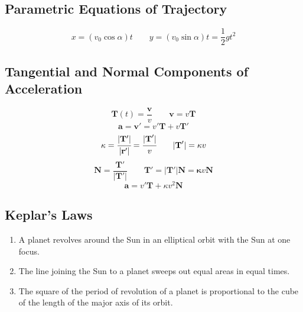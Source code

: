 \subsection*{Parametric Equations of Trajectory}
$$x=(v_0\cos{\alpha})t\qquad y=(v_0\sin{\alpha})t=\frac{1}{2}gt^2$$

\subsection*{Tangential and Normal Components of Acceleration}
$$\textbf{T}(t)=\frac{\textbf{v}}{v} \qquad \textbf{v}=v\textbf{T}$$
$$\textbf{a}=\textbf{v}'=v'\textbf{T}+v\textbf{T}'$$
$$\kappa=\mathbf{\cfrac{|T'|}{|r'|}}=\cfrac{|\textbf{T}'|}{v} \qquad
    |\textbf{T}'|=\kappa v$$
$$\textbf{N}=\mathbf{\frac{T'}{|T'|}}\qquad \mathbf{T'=|T'|N=\kappa}v\textbf{N}$$
$$\textbf{a}=v'\textbf{T}+\kappa v^2 \textbf{N}$$

\subsection*{Keplar's Laws}
\begin{enumerate}
    \item A planet revolves around the Sun in an elliptical orbit with the Sun at one focus.
    \item The line joining the Sun to a planet sweeps out equal areas in equal times.
    \item The square of the period of revolution of a planet is proportional to the cube
          of the length of the major axis of its orbit.
\end{enumerate}